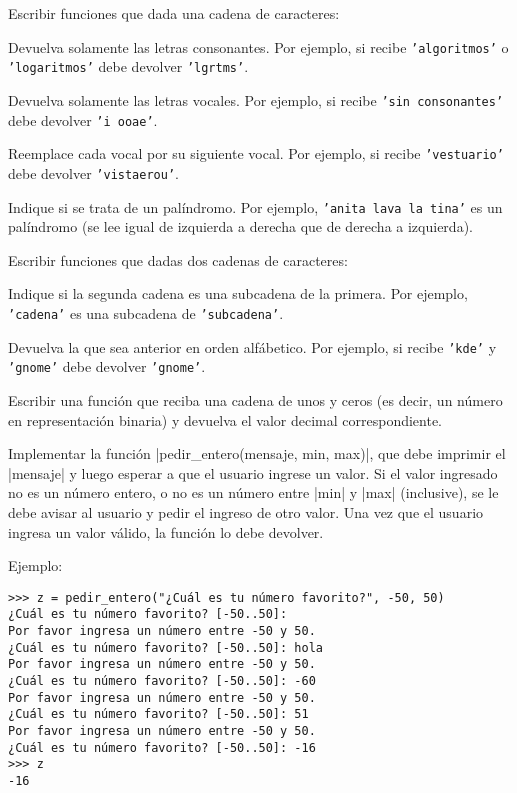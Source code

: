 \begin{ejercicio}
Escribir funciones que dada una cadena de caracteres:
\begin{partes}
\item Devuelva solamente las letras consonantes. Por ejemplo, si recibe
\texttt{'algoritmos'} o \texttt{'logaritmos'} debe devolver \texttt{'lgrtms'}.
\item Devuelva solamente las letras vocales. Por ejemplo, si recibe \texttt{'sin
consonantes'} debe devolver \texttt{'i ooae'}.
\item Reemplace cada vocal por su siguiente vocal. Por ejemplo, si recibe
\texttt{'vestuario'} debe devolver \texttt{'vistaerou'}.
\item Indique si se trata de un palíndromo. Por ejemplo, \texttt{'anita
lava la tina'} es un palíndromo (se lee igual de izquierda a derecha que de
derecha a izquierda).
\end{partes}
\end{ejercicio}


\begin{ejercicio}
Escribir funciones que dadas dos cadenas de caracteres:
\begin{partes}
\item Indique si la segunda cadena es una subcadena de la primera. Por ejemplo,
\texttt{'cadena'} es una subcadena de \texttt{'subcadena'}.
\item Devuelva la que sea anterior en orden alfábetico. Por ejemplo, si recibe
\texttt{'kde'} y \texttt{'gnome'} debe devolver \texttt{'gnome'}.
\end{partes}
\end{ejercicio}


\begin{ejercicio}
Escribir una función que reciba una cadena de unos y ceros (es decir, un
número en representación binaria) y devuelva el valor decimal
correspondiente.
\end{ejercicio}


\begin{ejercicio}
Implementar la función |pedir_entero(mensaje, min, max)|, que debe imprimir el
|mensaje| y luego esperar a que el usuario ingrese un valor.  Si el valor
ingresado no es un número entero, o no es un número entre |min| y |max|
(inclusive), se le debe avisar al usuario y pedir el ingreso de otro valor.
Una vez que el usuario ingresa un valor válido, la función lo debe devolver.

Ejemplo:

\begin{verbatim}
>>> z = pedir_entero("¿Cuál es tu número favorito?", -50, 50)
¿Cuál es tu número favorito? [-50..50]:
Por favor ingresa un número entre -50 y 50.
¿Cuál es tu número favorito? [-50..50]: hola
Por favor ingresa un número entre -50 y 50.
¿Cuál es tu número favorito? [-50..50]: -60
Por favor ingresa un número entre -50 y 50.
¿Cuál es tu número favorito? [-50..50]: 51
Por favor ingresa un número entre -50 y 50.
¿Cuál es tu número favorito? [-50..50]: -16
>>> z
-16
\end{verbatim}
\end{ejercicio}
